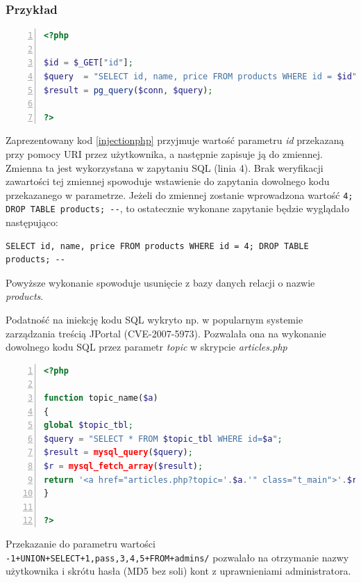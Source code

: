 \documentclass[11pt,a4paper,polish,thesis,oneside]{dcsbook}
\begin{document}
\subsubsection*{Przykład}
\begin{lstlisting}[language=php,frame=single,caption=kod podatny na iniekcję,label=injectionphp,numbers=left]
<?php

$id = $_GET["id"];
$query  = "SELECT id, name, price FROM products WHERE id = $id";
$result = pg_query($conn, $query);

?>
\end{lstlisting}
Zaprezentowany kod \ref{injectionphp} przyjmuje wartość parametru \textit{id} przekazaną przy pomocy URI przez użytkownika, a następnie zapisuje ją do zmiennej. Zmienna ta jest wykorzystana w zapytaniu SQL (linia 4). Brak weryfikacji zawartości tej zmiennej spowoduje wstawienie do zapytania dowolnego kodu przekazanego w parametrze. Jeżeli do zmiennej zostanie wprowadzona wartość \lstinline[frame=single]|4; DROP TABLE products; --|, to ostatecznie wykonane zapytanie będzie wyglądało następująco: 
\begin{lstlisting}
SELECT id, name, price FROM products WHERE id = 4; DROP TABLE products; --
\end{lstlisting}
Powyższe wykonanie spowoduje usunięcie z bazy danych relacji o nazwie \textit{products}.

Podatność na iniekcję kodu SQL wykryto np. w popularnym systemie zarządzania treścią JPortal (CVE-2007-5973). Pozwalała ona na wykonanie dowolnego kodu SQL przez parametr \textit{topic} w skrypcie \textit{articles.php}

\begin{lstlisting}[language=php,frame=single,caption=podatność articles.php w systemie JPortal,label=injectionjportal,numbers=left]
<?php

function topic_name($a)  
{     
global $topic_tbl; 
$query = "SELECT * FROM $topic_tbl WHERE id=$a"; 
$result = mysql_query($query);   
$r = mysql_fetch_array($result);     
return '<a href="articles.php?topic='.$a.'" class="t_main">'.$r['title'].'</a>';   
} 

?>
\end{lstlisting}

Przekazanie do parametru wartości \lstinline|-1+UNION+SELECT+1,pass,3,4,5+FROM+admins/| pozwalało na otrzymanie nazwy użytkownika i skrótu hasła (MD5 bez soli) kont z uprawnieniami administratora.
\end{document}

